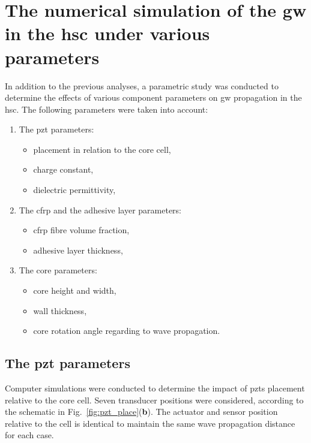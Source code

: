 \section{The numerical simulation of the \ac{gw} in the \ac{hsc} under various parameters}
\label{sec:parameters}

In addition to the previous analyses, a parametric study was conducted to determine the effects of various component parameters on \ac{gw} propagation in the \ac{hsc}. The following parameters were taken into account:
\begin{enumerate}
	\item The \ac{pzt} parameters:
	\begin{itemize}
		\item placement in relation to the core cell,
		\item charge constant,
		\item dielectric permittivity,
	\end{itemize}
	\item The \ac{cfrp} and the adhesive layer parameters:
		\begin{itemize}
		\item \ac{cfrp} fibre volume fraction,
		\item adhesive layer thickness,
		\end{itemize}
	\item The core parameters:
	\begin{itemize}
		\item core height and width,
		\item wall thickness,
		\item core rotation angle regarding to wave propagation.
	\end{itemize}
\end{enumerate}

\subsection{The \ac{pzt} parameters}
Computer simulations were conducted to determine the impact of \acp{pzt} placement relative to the core cell.
Seven transducer positions were considered, according to the schematic in Fig.~\ref{fig:pzt_place}(\textbf{b}).
The actuator and sensor position relative to the cell is identical to maintain the same wave propagation distance for each case.

